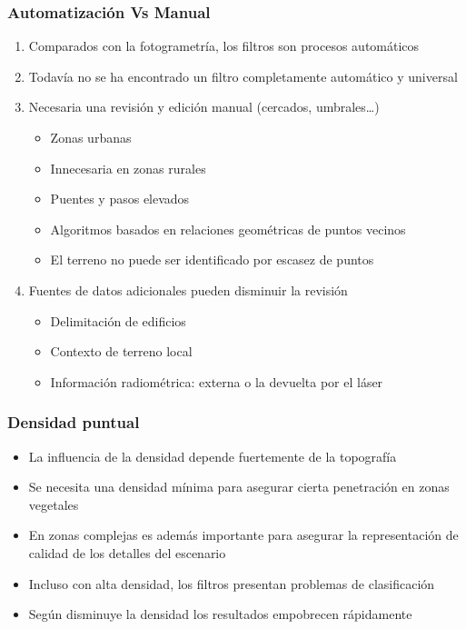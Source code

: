 \begin{frame}
  \frametitle{Automatización Vs Manual}
  \begin{enumerate}
    \item Comparados con la fotogrametría, los filtros son procesos \alert{automáticos}
    \item Todavía no se ha encontrado un filtro completamente automático y
      \alert{universal}
    \item \alert{Necesaria} una revisión y edición manual (cercados,
      umbrales\ldots)
      \begin{itemize}
        \item Zonas urbanas 
        \item \alert{Innecesaria en zonas rurales}
        \item Puentes y pasos elevados
        \item Algoritmos basados en relaciones geométricas de puntos vecinos
        \item El terreno no puede ser identificado por escasez de puntos
      \end{itemize}
    \item Fuentes de datos adicionales pueden disminuir la revisión
      \begin{itemize}
        \item Delimitación de edificios
        \item Contexto de terreno local
        \item Información radiométrica: \alert{externa} o la \alert{devuelta por
          el láser}
      \end{itemize}
  \end{enumerate}
\end{frame}
\begin{frame}
  \frametitle{Densidad puntual}
  \begin{itemize}
    \item La influencia de la densidad depende fuertemente de la topografía
    \item Se necesita una densidad mínima para asegurar cierta penetración en
      zonas vegetales
    \item En zonas complejas es además importante para asegurar la
      representación de calidad de los detalles del escenario
    \item Incluso con alta densidad, los filtros presentan problemas de
      clasificación
    \item Según disminuye la densidad los resultados empobrecen rápidamente
  \end{itemize}
\end{frame}
